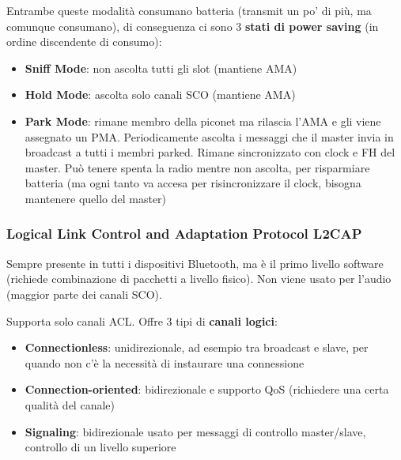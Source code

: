 Entrambe queste modalità consumano batteria (transmit un po' di più, ma comunque consumano), di conseguenza ci sono 3 \textbf{stati di power saving} (in ordine discendente di consumo): 
\begin{itemize}
\item \textbf{Sniff Mode}: non ascolta tutti gli slot (mantiene AMA)
\item \textbf{Hold Mode}: ascolta solo canali SCO (mantiene AMA)
\item \textbf{Park Mode}: rimane membro della piconet ma rilascia l'AMA e gli viene assegnato un PMA. Periodicamente ascolta i messaggi che il master invia in broadcast a tutti i membri parked. Rimane sincronizzato con clock e FH del master. Può tenere spenta la radio mentre non ascolta, per risparmiare batteria (ma ogni tanto va accesa per risincronizzare il clock, bisogna mantenere quello del master)
\end{itemize}

\subsubsection{Logical Link Control and Adaptation Protocol L2CAP}
Sempre presente in tutti i dispositivi Bluetooth, ma è il primo livello software (richiede combinazione di pacchetti a livello fisico). Non viene usato per l'audio (maggior parte dei canali SCO).

Supporta solo canali ACL. Offre 3 tipi di \textbf{canali logici}:
\begin{itemize}
	\item \textbf{Connectionless}: unidirezionale, ad esempio tra broadcast e slave, per quando non c'è la necessità di instaurare una connessione
	\item \textbf{Connection-oriented}: bidirezionale e supporto QoS (richiedere una certa qualità del canale)
	\item \textbf{Signaling}: bidirezionale usato per messaggi di controllo master/slave, controllo di un livello superiore
\end{itemize}

